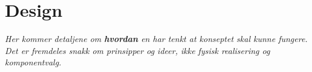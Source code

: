 \section{Design}
\label{sec:design}
\textit{Her kommer detaljene om \textbf{hvordan} en har tenkt at konseptet skal kunne fungere. Det er fremdeles snakk om prinsipper og ideer, ikke fysisk realisering og komponentvalg.}
